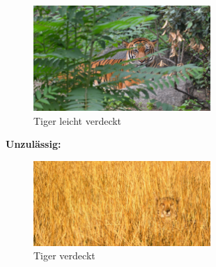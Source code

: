 \begin{figure}[htbp]
	\centering
		\includegraphics[width=0.60\textwidth]{BilderPDF/zielsetzung/tiger_03.jpg}
	\caption{Tiger leicht verdeckt \cite{tiger_leicht_verdeckt}}
	\label{fig:tiger_03}
\end{figure}

\vspace{5cm}

\textbf{Unzulässig:}

\begin{figure}[htbp]
	\centering
		\includegraphics[width=0.60\textwidth]{BilderPDF/zielsetzung/tiger_04.jpg}
	\caption{Tiger verdeckt \cite{tiger_verdeckt}}
	\label{fig:tiger_04}
\end{figure}
